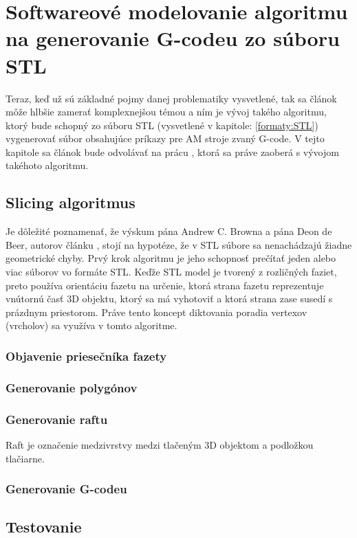 \documentclass[10pt,twoside,slovak,a4paper]{article}
\begin{document}
\section{Softwareové modelovanie algoritmu na generovanie G-codeu zo súboru STL}\label{Slicer_vyvoj}
   Teraz, keď už sú základné pojmy danej problematiky vysvetlené, tak sa článok môže hlbšie zamerať komplexnejšou témou a ním je vývoj takého algoritmu, ktorý bude schopný zo súboru STL (vysvetlené v kapitole: \ref{formaty:STL}) vygenerovať súbor obsahujúce príkazy pre AM stroje zvaný G-code.
\newline
    V tejto kapitole sa článok bude odvolávať na prácu \cite{6757836}, ktorá sa práve zaoberá s vývojom takéhoto algoritmu.
\subsection{Slicing algoritmus}\label{Slicer_vyvoj:Slicing}
    Je dôležité poznamenať, že výskum pána Andrew C. Browna a pána Deon de Beer, autorov článku \cite{6757836}, stojí na hypotéze, že v STL súbore sa nenachádzajú žiadne geometrické chyby.
     \newline Prvý krok algoritmu je jeho schopnosť prečítať jeden alebo viac súborov vo formáte STL. Keďže STL model je tvorený z rozličných faziet, preto používa orientáciu fazetu na určenie, ktorá strana fazetu reprezentuje vnútornú časť 3D objektu, ktorý sa má vyhotoviť a ktorá strana zase susedí s prázdnym priestorom. Práve tento koncept diktovania poradia vertexov (vrcholov) sa využíva v tomto algoritme.
\subsubsection{Objavenie priesečníka fazety}

\subsubsection{Generovanie polygónov}

\subsubsection{Generovanie raftu}
Raft je označenie medzivrstvy medzi tlačeným 3D objektom a podložkou tlačiarne.
\subsubsection{Generovanie G-codeu}

\subsection{Testovanie}\label{Slicer_vyvoj:Testovanie}
\end{document}
